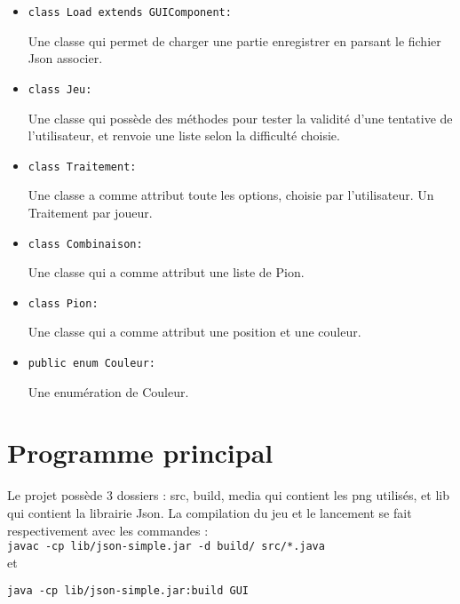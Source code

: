 \documentclass{article}
\begin{document}
\begin{itemize}
\item
\begin{verbatim}
class Load extends GUIComponent:
\end{verbatim}
Une classe qui permet de charger une partie enregistrer en parsant le fichier Json associer.

\item
\begin{verbatim}
class Jeu:
\end{verbatim}
Une classe qui possède des méthodes pour tester la validité d'une tentative de l'utilisateur, et renvoie une liste selon la difficulté choisie.

\item
\begin{verbatim}
class Traitement:
\end{verbatim}
Une classe a comme attribut toute les options, choisie par l'utilisateur. Un Traitement par joueur.

\item
\begin{verbatim}
class Combinaison:
\end{verbatim}
Une classe qui a comme attribut une liste de Pion.

\item
\begin{verbatim}
class Pion:
\end{verbatim}
Une classe qui a comme attribut une position et une couleur.

\item
\begin{verbatim}
public enum Couleur:
\end{verbatim}
Une enumération de Couleur.

\end{itemize}

\section{Programme principal}
Le projet possède 3 dossiers : src, build, media qui contient les png utilisés, et lib qui contient la librairie Json.
La compilation du jeu et le lancement se fait respectivement avec les commandes :\\

\texttt{javac -cp lib/json-simple.jar -d build/ src/*.java}\\ et

\texttt{java -cp lib/json-simple.jar:build GUI}\\
\end{document}
